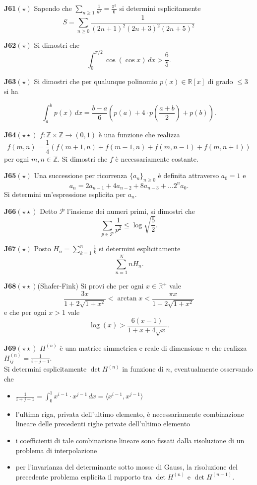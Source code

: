 \documentclass[a4paper,twoside]{article}
\theoremstyle{definition}
\numberwithin{theorem}{section}
\begin{document}
\textbf{J61}$(\star)$ Sapendo che $\sum_{n\geq 1}\frac{1}{n^2}=\frac{\pi^2}{6}$ si determini esplicitamente
$$ S = \sum_{n\geq 0}\frac{1}{(2n+1)^2 (2n+3)^2 (2n+5)^2} $$

\textbf{J62}$(\star)$ Si dimostri che 
$$ \int_{0}^{\pi/2}\cos(\cos x)\,dx > \frac{6}{5}.$$

\textbf{J63}$(\star)$ Si dimostri che per qualunque polinomio $p(x)\in\mathbb{R}[x]$ di grado $\leq 3$ si ha 

$$ \int_{a}^{b} p(x)\,dx = \frac{b-a}{6}\left(p(a)+4\cdot p\left(\frac{a+b}{2}\right)+p(b)\right). $$

\textbf{J64}$(\star\star)$ $f:\mathbb{Z}\times\mathbb{Z}\to (0,1)$ è una funzione che realizza
$$ f(m,n) = \frac{1}{4}\left(f(m+1,n)+f(m-1,n)+f(m,n-1)+f(m,n+1)\right) $$
per ogni $m,n\in\mathbb{Z}$. Si dimostri che $f$ è necessariamente costante.

\textbf{J65}$(\star)$ Una successione per ricorrenza $\{a_n\}_{n\geq 0}$ è definita attraverso $a_0=1$ e 
$$ a_n = 2 a_{n-1} + 4 a_{n-2} + 8 a_{n-3}+\ldots 2^n a_{0}.$$
Si determini un'espressione esplicita per $a_n$.

\textbf{J66}$(\star\star)$ Detto $\mathcal{P}$ l'insieme dei numeri primi, si dimostri che 
$$ \sum_{p\in\mathcal{P}}\frac{1}{p^2} \leq \log\sqrt{\frac{5}{2}}.$$

\textbf{J67}$(\star)$ Posto $H_n=\sum_{k=1}^{n}\frac{1}{k}$ si determini esplicitamente
$$ \sum_{n=1}^{N} n H_n. $$

\textbf{J68}$(\star\star)$(Shafer-Fink) Si provi che per ogni $x\in\mathbb{R}^+$ vale 
$$ \frac{3x}{1+2\sqrt{1+x^2}} < \arctan x < \frac{\pi x}{1+2\sqrt{1+x^2}} $$ 
e che per ogni $x> 1$ vale
$$ \log(x) > \frac{6(x-1)}{1+x+4\sqrt{x}}. $$

\textbf{J69}$(\star\star)$ $H^{(n)}$ è una matrice simmetrica e reale di dimensione $n$ che realizza $H_{ij}^{(n)}=\frac{1}{i+j-1}$.\\ Si determini esplicitamente $\det H^{(n)}$ in funzione di $n$, eventualmente osservando che
\begin{itemize}
\item $\frac{1}{i+j-1}=\int_{0}^{1}x^{i-1}\cdot x^{j-1}\,dx = \langle x^{i-1}, x^{j-1}\rangle $
\item l'ultima riga, privata dell'ultimo elemento, è necessariamente combinazione lineare delle precedenti righe private dell'ultimo elemento
\item i coefficienti di tale combinazione lineare sono fissati dalla risoluzione di un problema di interpolazione 
\item per l'invarianza del determinante sotto mosse di Gauss, la risoluzione del precedente problema esplicita il rapporto tra $\det H^{(n)}$ e $\det H^{(n-1)}$.
\end{itemize}
\end{document}
